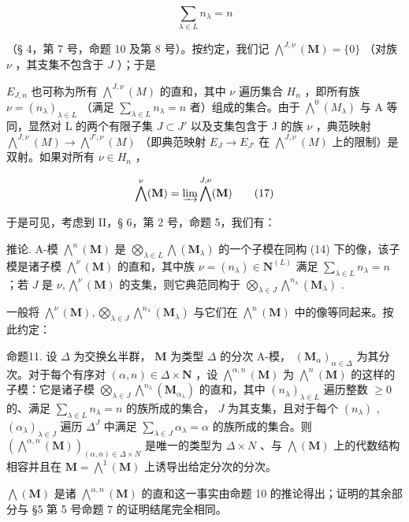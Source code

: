 \[
\sum_ {\lambda \in L} n _ {\lambda} = n
\]

（§ 4，第 7 号，命题 10 及第 8 号）。按约定，我们记 \(\bigwedge^{J,\nu}(\mathbf{M}) = \{0\}\) （对族 \(\nu\) ，其支集不包含于 \(J\) ）；于是

\(E_{J,n}\) 也可称为所有 \(\bigwedge^{J,\nu}(M)\) 的直和，其中 \(\nu\) 遍历集合 \(H_n\) ，即所有族 \(\nu = (n_\lambda)_{\lambda \in L}\) （满足 \(\sum_{\lambda \in L} n_\lambda = n\) 者）组成的集合。由于 \(\bigwedge^0(M_\lambda)\) 与 A 等同，显然对 L 的两个有限子集 \(J \subset J'\) 以及支集包含于 J 的族 \(\nu\) ，典范映射 \(\bigwedge^{J,\nu}(M) \to \bigwedge^{J',\nu}(M)\) （即典范映射 \(E_J \to E_{J'}\) 在 \(\bigwedge^{J,\nu}(M)\) 上的限制）是双射。如果对所有 \(\nu \in H_n\) ，

\[
\bigwedge^ {\nu} (\mathbf {M}) = \varinjlim \bigwedge^ {J, \nu} (\mathbf {M})\tag{17}
\]

于是可见，考虑到 II，§ 6，第 2 号，命题 5，我们有：

推论. A-模 \(\bigwedge^{n}(\mathbf{M})\) 是 \(\bigotimes_{\lambda \in L} \bigwedge (\mathbf{M}_{\lambda})\) 的一个子模在同构 (14) 下的像，该子模是诸子模 \(\bigwedge^{\nu}(\mathbf{M})\) 的直和，其中族 \(\nu = (n_{\lambda}) \in \mathbf{N}^{(L)}\) 满足 \(\sum_{\lambda \in L} n_{\lambda} = n\) ；若 \(J\) 是 \(\nu, \bigwedge^{\nu}(\mathbf{M})\) 的支集，则它典范同构于 \(\bigotimes_{\lambda \in J} \bigwedge^{n_{\lambda}}(\mathbf{M}_{\lambda})\) .

一般将 \(\bigwedge^{\nu}(\mathbf{M}),\bigotimes_{\lambda \in J}\bigwedge^{n_{\lambda}}(\mathbf{M}_{\lambda})\) 与它们在 \(\bigwedge^n (\mathbf{M})\) 中的像等同起来。按此约定：

命题11. 设 \(\Delta\) 为交换幺半群， \(\mathbf{M}\) 为类型 \(\Delta\) 的分次 A-模， \((\mathbf{M}_{\alpha})_{\alpha \in \Delta}\) 为其分次。对于每个有序对 \((\alpha, n) \in \Delta \times \mathbf{N}\) ，设 \(\bigwedge^{\alpha, n}(\mathbf{M})\) 为 \(\bigwedge^n (\mathbf{M})\) 的这样的子模：它是诸子模 \(\bigotimes_{\lambda \in J} \bigwedge^{n_{\lambda}}(\mathbf{M}_{\alpha_{\lambda}})\) 的直和，其中 \((n_{\lambda})_{\lambda \in L}\) 遍历整数 \(\geqslant 0\) 的、满足 \(\sum_{\lambda \in L} n_{\lambda} = n\) 的族所成的集合， \(J\) 为其支集，且对于每个 \((n_{\lambda})\) , \((\alpha_{\lambda})_{\lambda \in J}\) 遍历 \(\Delta^J\) 中满足 \(\sum_{\lambda \in J} \alpha_{\lambda} = \alpha\) 的族所成的集合。则 \((\bigwedge^{\alpha, n}(\mathbf{M}))_{(\alpha, n) \in \Delta \times N}\) 是唯一的类型为 \(\Delta \times N\) 、与 \(\bigwedge(\mathbf{M})\) 上的代数结构相容并且在 \(\mathbf{M} = \bigwedge^1 (\mathbf{M})\) 上诱导出给定分次的分次。

\(\bigwedge (\mathbf{M})\) 是诸 \(\bigwedge^{\alpha ,n}(\mathbf{M})\) 的直和这一事实由命题 10 的推论得出；证明的其余部分与 §5 第 5 号命题 7 的证明结尾完全相同。

